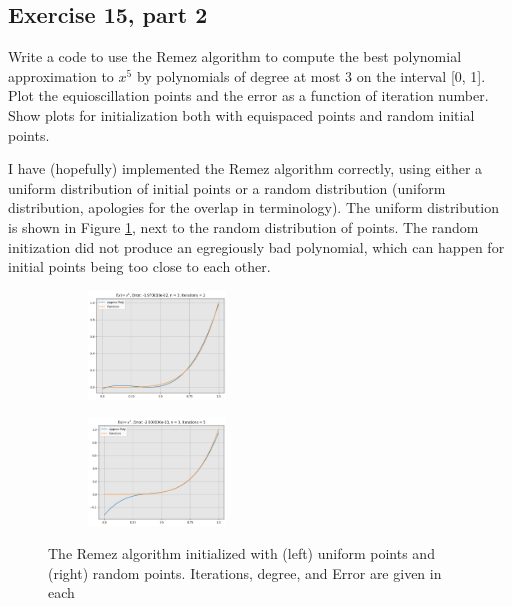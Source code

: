 \newpage
\subsection{Exercise 15, part 2}
Write a code to use the Remez algorithm to compute the best polynomial approximation to $x^5$ by polynomials of degree at most 3 on the interval [0, 1]. Plot the equioscillation points and the error as a function of iteration number. Show plots for initialization both with equispaced points and random initial points.
\partbreak
\begin{solution}

    I have (hopefully) implemented the Remez algorithm correctly, using either a uniform distribution of initial points or a random distribution (uniform distribution, apologies for the overlap in terminology). The uniform distribution is shown in Figure \ref{fig:RemezFinal}, next to the random distribution of points. The random initization did not produce an egregiously bad polynomial, which can happen for initial points being too close to each other.  
\end{solution}

\vspace{1in}
\begin{figure}[!hb]
\centering
    \begin{subfigure}
        \centering
        \includegraphics[width = 0.4\textwidth]{Figures/RemezFinalUnif.png}
    \end{subfigure}
    \begin{subfigure}
        \centering
        \includegraphics[width = 0.4\textwidth]{Figures/RemezFinalRandom.png}
    \end{subfigure}
    \caption{The Remez algorithm initialized with (left) uniform points and (right) random points. Iterations, degree, and Error are given in each}
    \label{fig:RemezFinal}
\end{figure}

